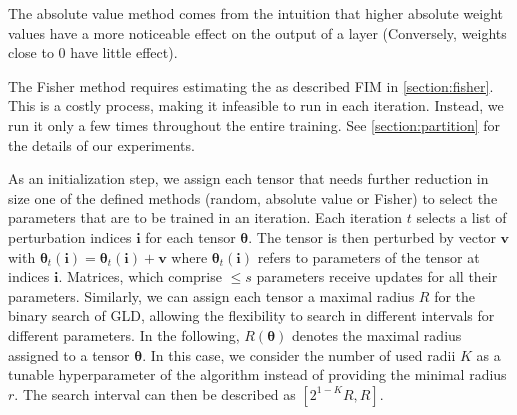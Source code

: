 The absolute value 
method comes from the intuition that higher absolute 
weight values have a more noticeable effect on the output of a layer
(Conversely, weights close to 0 
have little effect). 

The Fisher method requires
estimating the  as described \ac{FIM}
in \autoref{section:fisher}. This is a costly process,
making it infeasible to run in each iteration. Instead,
we run it only a few times 
throughout the entire training. See 
\autoref{section:partition} for the details 
of our experiments. 


As an initialization step, we assign each tensor 
that needs further reduction in size one of the defined 
methods (random, absolute value or Fisher) 
to select the parameters 
that are to be trained in an iteration.
Each iteration $t$ selects a list of perturbation indices $\mathbf{i}$
for each tensor $\bm{\theta}$.
The tensor is then perturbed by vector $\mathbf{v}$ with
$\bm{\theta}_t(\mathbf{i}) = \bm{\theta}_t(\mathbf{i}) + \mathbf{v}$
where $\bm{\theta}_t(\mathbf{i})$ refers to parameters 
of the tensor at indices $\mathbf{i}$. 
Matrices, which comprise 
$\leq s$ parameters receive updates for all their 
parameters. Similarly, 
we can assign each tensor a maximal radius 
$R$ for the binary search of \ac{GLD}, allowing 
the flexibility to search
in different intervals for different parameters. 
In the following,  
$R(\bm{\theta})$ denotes the maximal radius assigned to 
a tensor $\bm{\theta}$.
In this case, we consider the number of used radii $K$ 
as a tunable hyperparameter of 
the algorithm instead of providing the minimal radius $r$.
The search interval can then be described as 
$[2^{1-K}R, R]$.

